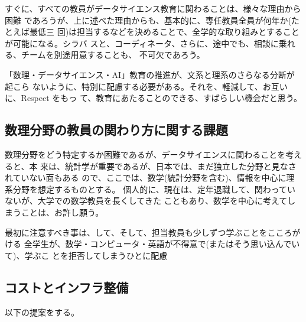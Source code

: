 \documentclass[
]{book}
\theoremstyle{definition}
\theoremstyle{definition}
\theoremstyle{definition}
\theoremstyle{definition}
\theoremstyle{remark}
\begin{document}
すぐに、すべての教員がデータサイエンス教育に関わることは、様々な理由から困難 であろうが、上に述べた理由からも、基本的に、専任教員全員が何年か(たとえば最低三 回)は担当するなどを決めることで、全学的な取り組みとすることが可能になる。シラバ スと、コーディネータ、さらに、途中でも、相談に乗れる、チームを別途用意することも、 不可欠であろう。

「数理・データサイエンス・AI」教育の推進が、文系と理系のさらなる分断が起こら ないように、特別に配慮する必要がある。それを、軽減して、お互いに、Respect をもっ て、教育にあたることのできる、すばらしい機会だと思う。

\hypertarget{ux6570ux7406ux5206ux91ceux306eux6559ux54e1ux306eux95a2ux308fux308aux65b9ux306bux95a2ux3059ux308bux8ab2ux984c}{%
\subsection{数理分野の教員の関わり方に関する課題}\label{ux6570ux7406ux5206ux91ceux306eux6559ux54e1ux306eux95a2ux308fux308aux65b9ux306bux95a2ux3059ux308bux8ab2ux984c}}

数理分野をどう特定するか困難であるが、データサイエンスに関わることを考えると、本 来は、統計学が重要であるが、日本では、まだ独立した分野と見なされていない面もある ので、ここでは、数学(統計分野を含む)、情報を中心に理系分野を想定するものとする。 個人的に、現在は、定年退職して、関わっていないが、大学での数学教員を長くしてきた こともあり、数学を中心に考えてしまうことは、お許し願う。

最初に注意すべき事は、して、そして、担当教員も少しずつ学ぶことをこころがける 全学生が、数学・コンピュータ・英語が不得意で(またはそう思い込んでいて)、学ぶこ とを拒否してしまうひとに配慮

\hypertarget{ux30b3ux30b9ux30c8ux3068ux30a4ux30f3ux30d5ux30e9ux6574ux5099}{%
\subsection{コストとインフラ整備}\label{ux30b3ux30b9ux30c8ux3068ux30a4ux30f3ux30d5ux30e9ux6574ux5099}}

以下の提案をする。
\end{document}
